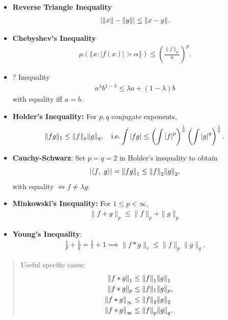 \begin{itemize}
\item
  \textbf{Reverse Triangle Inequality} \begin{align*}
  {\left\lvert {{\left\lVert {x} \right\rVert} - {\left\lVert {y} \right\rVert}} \right\rvert} \leq {\left\lVert {x - y} \right\rVert}
  .\end{align*}
\item
  \textbf{Chebyshev's Inequality} \begin{align*}
  \mu(\{x:|f(x)|>\alpha\}) \leq\left(\frac{\|f\|_{p}}{\alpha}\right)^{p}
  .\end{align*}
\item
  ? Inequality
  \begin{align*}
  a^{\lambda} b^{1-\lambda} \leq \lambda a+(1-\lambda) b
  \end{align*} with equality iff \(a=b\).
\item
  \textbf{Holder's Inequality:} For \(p,q\) conjugate exponents,
  \begin{align*}
  \|f g\|_{1} \leq\|f\|_{p}\|g\|_{q}, \quad \text{i.e.} \int {\left\lvert {fg} \right\rvert} 
  \leq \left( \int {\left\lvert {f} \right\rvert}^p \right)^{\frac 1 p} \left( \int {\left\lvert {g} \right\rvert}^q \right)^{\frac 1 q}
  .\end{align*}
\item
  \textbf{Cauchy-Schwarz}: Set \(p=q=2\) in Holder's inequality to
  obtain \begin{align*}
  {\left\lvert {{\left\langle {f},~{g} \right\rangle}} \right\rvert} = {\left\lVert {fg} \right\rVert}_1 \leq {\left\lVert {f} \right\rVert}_2 {\left\lVert {g} \right\rVert}_2 
  ,\end{align*} with equality \(\iff f \neq \lambda g\).
\item
  \textbf{Minkowski's Inequality:} For \(1\leq p < \infty\),
  \begin{align*}
  \|f+g\|_{p} \leq\|f\|_{p}+\|g\|_{p}
  \end{align*}
\item
  \textbf{Young's Inequality}: \begin{align*}
  \frac 1 p + \frac 1 q = \frac 1 r + 1 \implies
  \|f \ast g\|_{r} \leq\|f\|_{p}\|g\|_{q}
  .\end{align*}
\end{itemize}

\begin{quote}
Useful specific cases: \begin{align*}
{\left\lVert {f\ast g} \right\rVert}_1 &\leq {\left\lVert {f} \right\rVert}_1 {\left\lVert {g} \right\rVert}_1 \\
\|f * g\|_{p} &\leq\|f\|_{1}\|g\|_{p}, \\
{\left\lVert {f\ast g} \right\rVert}_\infty &\leq {\left\lVert {f} \right\rVert}_2 {\left\lVert {g} \right\rVert}_2 \\
{\left\lVert {f\ast g} \right\rVert}_\infty &\leq {\left\lVert {f} \right\rVert}_p {\left\lVert {g} \right\rVert}_q
.\end{align*}
\end{quote}

